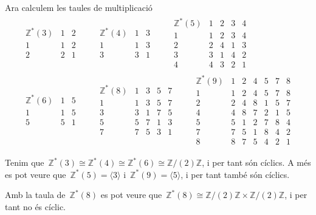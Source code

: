 \documentclass[a4paper]{article}
\theoremstyle{plain}
\theoremstyle{definition}
\newcommand{\ZZ}{\mathbb{Z}}
\begin{document}
Ara calculem les taules de multiplicació
\begin{gather*}
    \begin{array}{c|cc}
        \ZZ^{\ast}(3) & 1 & 2 \\\hline
        1 & 1 & 2 \\
        2 & 2 & 1
    \end{array}
    \qquad
    \begin{array}{c|cc}
        \ZZ^{\ast}(4) & 1 & 3 \\\hline
        1 & 1 & 3 \\
        3 & 3 & 1
    \end{array}
    \qquad
    \begin{array}{c|cccc}
        \ZZ^{\ast}(5) & 1 & 2 & 3 & 4 \\\hline
        1 & 1 & 2 & 3 & 4 \\
        2 & 2 & 4 & 1 & 3 \\
        3 & 3 & 1 & 4 & 2 \\
        4 & 4 & 3 & 2 & 1
    \end{array}
    \\
    \begin{array}{c|cc}
        \ZZ^{\ast}(6) & 1 & 5 \\\hline
        1 & 1 & 5 \\
        5 & 5 & 1
    \end{array}
    \qquad
    \begin{array}{c|cccc}
        \ZZ^{\ast}(8) & 1 & 3 & 5 & 7 \\\hline
        1 & 1 & 3 & 5 & 7 \\
        3 & 3 & 1 & 7 & 5 \\
        5 & 5 & 7 & 1 & 3 \\
        7 & 7 & 5 & 3 & 1
    \end{array}
    \qquad
    \begin{array}{c|cccccc}
        \ZZ^{\ast}(9) & 1 & 2 & 4 & 5 & 7 & 8 \\\hline
        1 & 1 & 2 & 4 & 5 & 7 & 8 \\
        2 & 2 & 4 & 8 & 1 & 5 & 7 \\
        4 & 4 & 8 & 7 & 2 & 1 & 5 \\
        5 & 5 & 1 & 2 & 7 & 8 & 4 \\
        7 & 7 & 5 & 1 & 8 & 4 & 2 \\
        8 & 8 & 7 & 5 & 4 & 2 & 1
    \end{array}
\end{gather*}

Tenim que~\(\ZZ^{\ast}(3) \cong \ZZ^{\ast}(4) \cong \ZZ^{\ast}(6) \cong
\ZZ/(2)\ZZ\), i per tant són cíclics. A més es pot veure
que~\(\ZZ^{\ast}(5)=\langle3\rangle\) i~\(\ZZ^{\ast}(9)=\langle5\rangle\), i per
tant també són cíclics.

Amb la taula de~\(\ZZ^{\ast}(8)\) es pot veure
que~\(\ZZ^{\ast}(8) \cong \ZZ/(2)\ZZ \times \ZZ/(2)\ZZ\),
i per tant no és cíclic.
\end{document}
